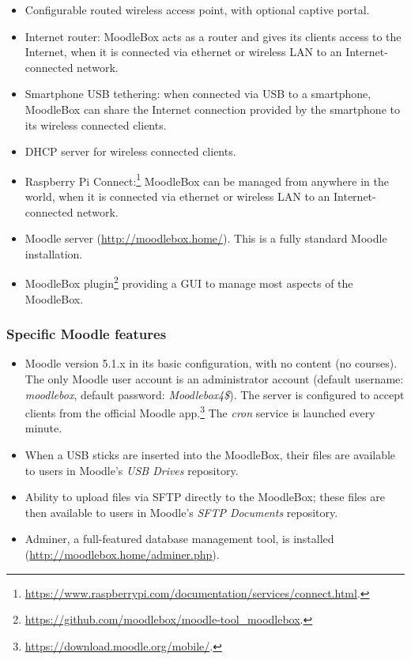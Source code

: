 \documentclass[12pt]{article}
\begin{document}
\begin{itemize}
\item Configurable routed wireless access point, with optional captive portal.
\item Internet router: MoodleBox acts as a router and gives its clients access to the Internet, when it is connected via ethernet or wireless LAN to an Internet-connected network.
\item Smartphone USB tethering: when connected via USB to a smartphone, MoodleBox can share the Internet connection provided by the smartphone to its wireless connected clients.
\item DHCP server for wireless connected clients.
\item Raspberry Pi Connect:\footnote{\url{https://www.raspberrypi.com/documentation/services/connect.html}.} MoodleBox can be managed from anywhere in the world, when it is connected via ethernet or wireless LAN to an Internet-connected network.
\item Moodle server (\url{http://moodlebox.home/}).
This is a fully standard Moodle installation.
\item MoodleBox plugin\footnote{\url{https://github.com/moodlebox/moodle-tool_moodlebox}.} providing a GUI to manage most aspects of the MoodleBox.
\end{itemize}

\subsubsection{Specific Moodle features}
\begin{itemize}
\item Moodle version 5.1.x in its basic configuration, with no content (no courses).
The only Moodle user account is an administrator account (default username: \emph{moodlebox}, default password: \emph{Moodlebox4\$}).
The server is configured to accept clients from the official Moodle app.\footnote{\url{https://download.moodle.org/mobile/}.}
The \textsl{cron} service is launched every minute.
\item When a USB sticks are inserted into the MoodleBox, their files are available to users in Moodle's \textsl{USB Drives} repository.
\item Ability to upload files via SFTP directly to the MoodleBox; these files are then available to users in Moodle's \textsl{SFTP Documents} repository.
\item Adminer, a full-featured database management tool, is installed (\url{http://moodlebox.home/adminer.php}).
\end{itemize}
\end{document}
